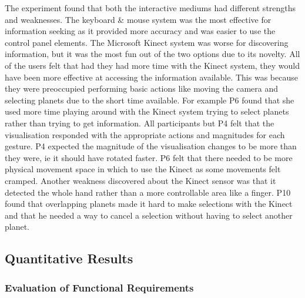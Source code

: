 \begin{enumerate}
The experiment found that both the interactive mediums had different
strengths and weaknesses. The keyboard \& mouse system was the most effective
for information seeking as it provided more accuracy and was easier to use the
control panel elements. The Microsoft Kinect system was worse for discovering
information, but it was the most fun out of the two options due to its novelty.
All of the users felt that had they had more time with the Kinect system, they
would have been more effective at accessing the information available. This was
because they were preoccupied performing basic actions like moving the camera
and selecting planets due to the short time available. For example P6 found that
she used more time playing around with the Kinect system trying to select
planets rather than trying to get information. All participants but P4 felt that
the visualisation responded with the appropriate actions and magnitudes for each
gesture. P4 expected the magnitude of the visualisation changes to be more
than they were, ie it should have rotated faster. P6 felt that there needed to
be more physical movement space in which to use the Kinect as some movements
felt
cramped. Another weakness discovered about the Kinect sensor was that it
detected the whole hand rather than a more controllable area like a finger.
P10 found that overlapping planets made it hard to make selections with the
Kinect and that he needed a way to cancel a selection without having to select
another planet.

\end{enumerate}

\subsection{Quantitative Results}
\subsubsection{Evaluation of Functional Requirements}

